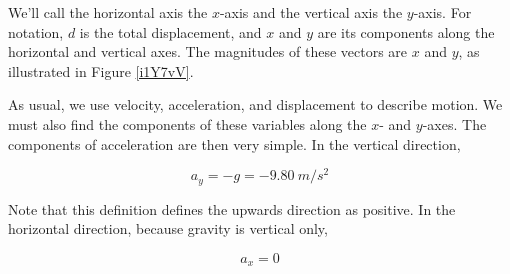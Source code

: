 \documentclass[main-physics.tex]{subfiles}
\begin{document}
\vspace{1em}

We'll call the horizontal axis the $x$-axis and the vertical axis the $y$-axis. For notation, $d$ is the total displacement, and $x$ and $y$ are its components along the horizontal and vertical axes. The magnitudes of these vectors are $x$ and $y$, as illustrated in Figure \ref{i1Y7vV}.

\begin{center}
    \captionsetup{type=figure,margin=1in,font=scriptsize}
    \label{i1Y7vV}
\end{center}

As usual, we use velocity, acceleration, and displacement to describe motion. We must also find the components of these variables along the $x$- and $y$-axes. The components of acceleration are then very simple. In the vertical direction,

\begin{equation}
    a_y = -g = -\SI{9.80}{m/s^2}
\end{equation}

Note that this definition defines the upwards direction as positive. In the horizontal direction, because gravity is vertical only,

\begin{equation}
    a_x = 0
\end{equation}
\end{document}
